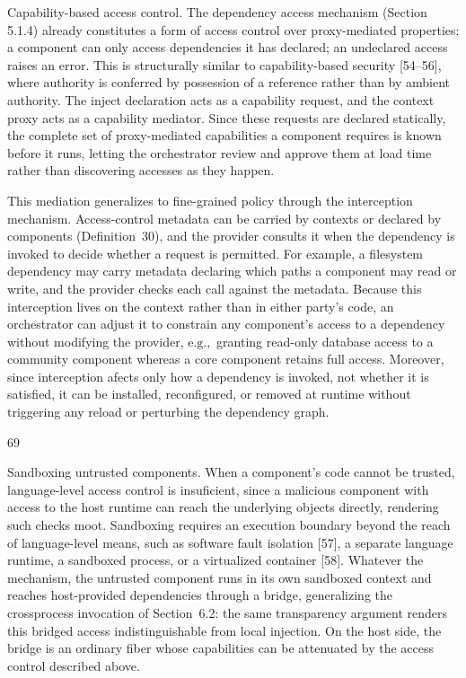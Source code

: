 \documentclass[
  10
]{article}
\begin{document}
Capability-based access control. The dependency access mechanism
(Section~ 5.1.4) already constitutes a form of access control over
proxy-mediated properties: a component can only access dependencies it
has declared; an undeclared access raises an error. This is structurally
similar to capability-based security {[}54--56{]}, where authority is
conferred by possession of a reference rather than by ambient authority.
The inject declaration acts as a capability request, and the context
proxy acts as a capability mediator. Since these requests are declared
statically, the complete set of proxy-mediated capabilities a component
requires is known before it runs, letting the orchestrator review and
approve them at load time rather than discovering accesses as they
happen.

This mediation generalizes to fine-grained policy through the
interception mechanism. Access-control metadata can be carried by
contexts or declared by components (Definition~30), and the provider
consults it when the dependency is invoked to decide whether a request
is permitted. For example, a filesystem dependency may carry metadata
declaring which paths a component may read or write, and the provider
checks each call against the metadata. Because this interception lives
on the context rather than in either party's code, an orchestrator can
adjust it to constrain any component's access to a dependency without
modifying the provider, \(\mathrm { e . g . , }\) granting read-only
database access to a community component whereas a core component
retains full access. Moreover, since interception afects only how a
dependency is invoked, not whether it is satisfied, it can be installed,
reconfigured, or removed at runtime without triggering any reload or
perturbing the dependency graph.

69

Sandboxing untrusted components. When a component's code cannot be
trusted, language-level access control is insuficient, since a malicious
component with access to the host runtime can reach the underlying
objects directly, rendering such checks moot. Sandboxing requires an
execution boundary beyond the reach of language-level means, such as
software fault isolation {[}57{]}, a separate language runtime, a
sandboxed process, or a virtualized container {[}58{]}. Whatever the
mechanism, the untrusted component runs in its own sandboxed context and
reaches host-provided dependencies through a bridge, generalizing the
crossprocess invocation of Section~6.2: the same transparency argument
renders this bridged access indistinguishable from local injection. On
the host side, the bridge is an ordinary fiber whose capabilities can be
attenuated by the access control described above.
\end{document}
